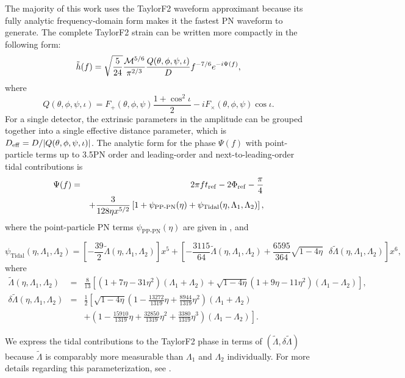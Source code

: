\documentclass[twocolumn,prd,amssymb,aps,nofootinbib,showpacs,epsf]{revtex4}
\begin{document}
The majority of this work uses the TaylorF2 waveform approximant because its fully analytic frequency-domain form makes it the fastest PN waveform to generate.  The complete TaylorF2 strain can be written more compactly in the following form:
\begin{equation}
\tilde{h}(f)=\sqrt{\frac{5}{24}}\frac{{\cal M}^{5/6}}{\pi^{2/3}}\frac{Q(\theta,\phi,\psi,\iota)}{D}f^{-7/6}e^{-i\Psi(f)},
\end{equation}
where
\begin{equation}
Q(\theta,\phi,\psi,\iota) = F_+(\theta,\phi,\psi)\frac{1+\cos^2\iota}{2} - i F_\times(\theta,\phi,\psi)\cos\iota.
\end{equation}
For a single detector, the extrinsic parameters in the amplitude can be grouped together into a single effective distance parameter, which is $D_{\rm eff}=D/|Q(\theta,\phi,\psi,\iota)|$.  The analytic form for the phase $\Psi(f)$ with point-particle terms up to 3.5PN order and leading-order and next-to-leading-order tidal contributions is
\begin{eqnarray}
\Psi(f)&=&2\pi f t_{\rm ref} - 2\Phi_{\rm ref} -\frac{\pi}{4}\\
\nonumber
&&+\frac{3}{128\eta x^{5/2}}\left[1+\psi_\text{PP-PN}(\eta)+\psi_\text{Tidal}(\eta,\Lambda_1,\Lambda_2)\right],
\end{eqnarray}
where the point-particle PN terms $\psi_\text{PP-PN}(\eta)$ are given in \cite{BuonannoIyerOchsner2009}, and
\begin{widetext}
\begin{equation}
\label{eq:psi_tidal}
\psi_\text{Tidal}(\eta,\Lambda_1,\Lambda_2)=\left[-\frac{39}{2}\tilde{\Lambda}(\eta,\Lambda_1,\Lambda_2)\right]x^5+ \left[-\frac{3115}{64}\tilde{\Lambda}(\eta,\Lambda_1,\Lambda_2)+\frac{6595}{364}\sqrt{1-4\eta}\mbox{ }\delta\tilde{\Lambda}(\eta,\Lambda_1,\Lambda_2)\right]x^6,
\end{equation}
where
\begin{eqnarray}
\label{eq:LT}
\tilde{\Lambda}(\eta,\Lambda_1,\Lambda_2)&=&\frac{8}{13}\left[\left(1+7\eta-31\eta^2\right)\left(\Lambda_1+\Lambda_2\right)+\sqrt{1-4\eta}\left(1+9\eta-11\eta^2\right)\left(\Lambda_1-\Lambda_2\right)\right],\\
\label{eq:dLT}
\delta\tilde{\Lambda}(\eta,\Lambda_1,\Lambda_2)&=&\frac{1}{2}\left[\sqrt{1-4\eta}\left(1-\frac{13272}{1319}\eta+\frac{8944}{1319}\eta^2\right)\left(\Lambda_1+\Lambda_2\right) \right .\\
&& + \left . \left(1-\frac{15910}{1319}\eta+\frac{32850}{1319}\eta^2+\frac{3380}{1319}\eta^3\right)\left(\Lambda_1-\Lambda_2\right)\right].
\end{eqnarray}
\end{widetext}
We express the tidal contributions to the TaylorF2 phase in terms of $(\tilde\Lambda,\delta\tilde\Lambda)$ because $\tilde\Lambda$ is comparably more measurable than $\Lambda_1$ and $\Lambda_2$ individually.  For more details regarding this parameterization, see \cite{WadeCreightonOchsner2014,Favata2014}.
\end{document}

